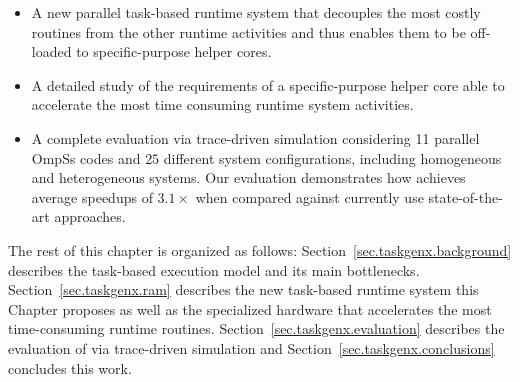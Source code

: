 \begin{itemize}

\item A new parallel task-based runtime system that decouples the most costly routines from the other runtime activities and thus enables them to be off-loaded to specific-purpose helper cores.

\item A detailed study of the requirements of a specific-purpose helper core able to accelerate the most time consuming runtime system activities. 

\item A complete evaluation via trace-driven simulation considering 11 parallel OmpSs codes and $25$ different system configurations, including homogeneous and heterogeneous systems. %
Our evaluation demonstrates how {\proposal} achieves average speedups of $3.1\times$ when compared against currently use state-of-the-art approaches.

\end{itemize} 

The rest of this chapter is organized as follows: 
Section~\ref{sec.taskgenx.background} describes the task-based execution model and its main bottlenecks.
Section~\ref{sec.taskgenx.ram} describes the new task-based runtime system this Chapter proposes as well as the specialized hardware that accelerates the most time-consuming runtime routines.
Section~\ref{sec.taskgenx.evaluation} describes the evaluation of {\proposal} via trace-driven simulation and Section~\ref{sec.taskgenx.conclusions} concludes this work.


